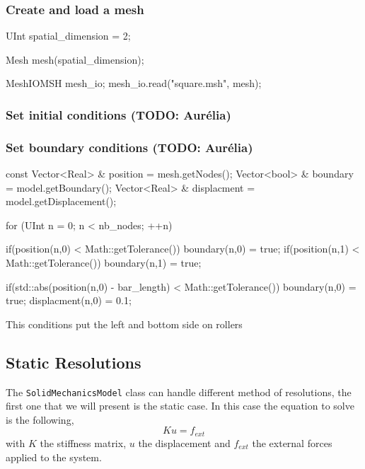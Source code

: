 \documentclass[a4paper,11pt]{book}
\newcommand{\code}[1]{{\tt{#1}}}
\newcommand{\todo}[1]{({\small\color{red}\textbf{TODO: }\textbf{#1}})}
\begin{document}
\subsubsection{Create and load a mesh\label{sect:common:mesh}}


\begin{cpp}
  UInt spatial_dimension = 2;

  Mesh mesh(spatial_dimension);

  MeshIOMSH mesh_io;
  mesh_io.read("square.msh", mesh);
\end{cpp}

\subsubsection{Set initial conditions \label{sect:smm:initial_condition}\todo{Aur\'elia}}
\subsubsection{Set boundary conditions\label{sect:smm:boundary} \todo{Aur\'elia}}

\begin{cpp}
  const  Vector<Real> & position = mesh.getNodes();
  Vector<bool> & boundary = model.getBoundary();
  Vector<Real> & displacment = model.getDisplacement();

  for (UInt n = 0; n < nb_nodes; ++n) {
    if(position(n,0) < Math::getTolerance()) boundary(n,0) = true;
    if(position(n,1) < Math::getTolerance()) boundary(n,1) = true;

    if(std::abs(position(n,0) - bar_length) < Math::getTolerance()) {
      boundary(n,0) = true;
      displacment(n,0) = 0.1;
    }
  }
\end{cpp}

This conditions put the left and bottom side on rollers

\subsection{Static Resolutions\label{sect:smm:static}}

The \code{SolidMechanicsModel} class can handle different method of resolutions,
the first one that we will present is the static case. In this case the equation
to solve is the following,
\begin{equation}\label{eqn:smm:static}
  K u = f_{ext}
\end{equation}
with $K$ the  stiffness matrix, $u$ the displacement  and $f_{ext}$ the external
forces applied to the system.
\end{document}
